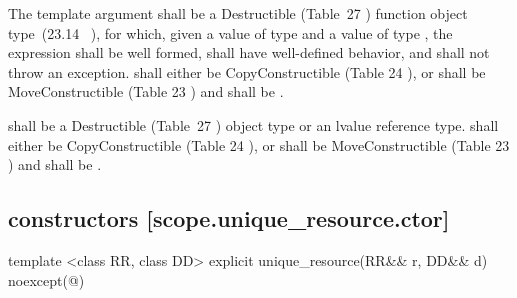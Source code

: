 \documentclass[ebook,11pt,article]{memoir}
\begin{document}
\pnum 
The template argument
 shall be a 
Destructible 
(Table~27
) function object type~(23.14~
), 
for which, given
a value  of type  and a value
 of type , the expression
 shall be well formed, shall have well-defined behavior, and shall not throw an exception.
 shall either be CopyConstructible (Table 24
), or 
 shall be MoveConstructible (Table 23
) and
 shall be .

\pnum
{} shall be a
Destructible 
(Table~27
) object type 
or an lvalue reference type.
 shall either be CopyConstructible (Table 24
),  or 
 shall be MoveConstructible (Table 23
) and
 shall be .

\newpage
\subsection { constructors [scope.unique_resource.ctor]}


\begin{itemdecl}
template <class RR, class DD>
explicit 
unique_resource(RR&& r, DD&& d) noexcept(@\seebelow@)
\end{itemdecl}
\end{document}
